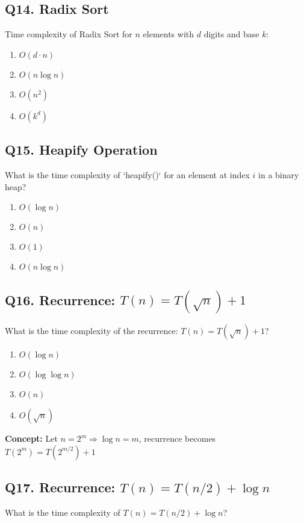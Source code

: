 \subsection*{Q14. Radix Sort}
Time complexity of Radix Sort for \(n\) elements with \(d\) digits and base \(k\):

\begin{enumerate}[label=(\alph*)]
    \item \(O(d \cdot n)\) \quad
    \item \(O(n \log n)\) \quad
    \item \(O(n^2)\) \quad
    \item \(O(k^d)\)
\end{enumerate}


\subsection*{Q15. Heapify Operation}
What is the time complexity of `heapify()` for an element at index \(i\) in a binary heap?

\begin{enumerate}[label=(\alph*)]
    \item \(O(\log n)\) \quad
    \item \(O(n)\) \quad
    \item \(O(1)\) \quad
    \item \(O(n \log n)\)
\end{enumerate}



\subsection*{Q16. Recurrence: \(T(n) = T(\sqrt{n}) + 1\)}
What is the time complexity of the recurrence: \(T(n) = T(\sqrt{n}) + 1\)?

\begin{enumerate}[label=(\alph*)]
    \item \(O(\log n)\) \quad
    \item \(O(\log \log n)\) \quad
    \item \(O(n)\) \quad
    \item \(O(\sqrt{n})\)
\end{enumerate}

\textbf{Concept:} Let \(n = 2^m \Rightarrow \log n = m\), recurrence becomes \(T(2^m) = T(2^{m/2}) + 1\)


\subsection*{Q17. Recurrence: \(T(n) = T(n/2) + \log n\)}
What is the time complexity of \(T(n) = T(n/2) + \log n\)?

